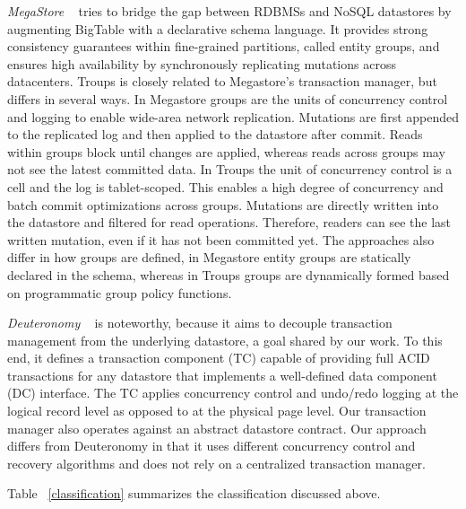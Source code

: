 \documentclass[10pt,final,journal]{IEEEtran}
\begin{document}
\emph{MegaStore} ~\cite{Furman:2008:8530095, Baker:2011:8530095} tries to bridge the gap between RDBMSs and NoSQL datastores by augmenting BigTable with a declarative schema language. It provides strong consistency guarantees within fine-grained partitions, called entity groups, and ensures high availability by synchronously replicating mutations across datacenters. Troups is closely related to Megastore's transaction manager, but differs in several ways. In Megastore groups are the units of concurrency control and logging to enable wide-area network replication. Mutations are first appended to the replicated log and then applied to the datastore after commit. Reads within groups block until changes are applied, whereas reads across groups may not see the latest committed data. In Troups the unit of concurrency control is a cell and the log is tablet-scoped. This enables a high degree of concurrency and batch commit optimizations across groups. Mutations are directly written into the datastore and filtered for read operations. Therefore, readers can see the last written mutation, even if it has not been committed yet. The approaches also differ in how groups are defined, in Megastore entity groups are statically declared in the schema, whereas in Troups groups are dynamically formed based on programmatic group policy functions.

\emph{Deuteronomy} ~\cite{Levandoski:2011:8530161} is noteworthy, because it aims to decouple transaction management from the underlying datastore, a goal shared by our work. To this end, it defines a transaction component (TC) capable of providing full ACID transactions for any datastore that implements a well-defined data component (DC) interface. The TC applies concurrency control and undo/redo logging at the logical record level as opposed to at the physical page level. Our transaction manager also operates against an abstract datastore contract. Our approach differs from Deuteronomy in that it uses different concurrency control and recovery algorithms and does not rely on a centralized transaction manager.

Table ~\ref{classification} summarizes the classification discussed above.
\end{document}
